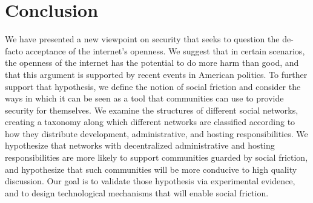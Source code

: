 \documentclass[sigconf,authordraft]{acmart}
\begin{document}
\section{Conclusion}

We have presented a new viewpoint on security that seeks to question the de-facto acceptance of the internet's openness. We suggest that in certain scenarios, the openness of the internet has the potential to do more harm than good, and that this argument is supported by recent events in American politics. To further support that hypothesis, we define the notion of social friction and consider the ways in which it can be seen as a tool that communities can use to provide security for themselves. We examine the structures of different social networks, creating a taxonomy along which different networks are classified according to how they distribute development, administrative, and hosting responsibilities. We hypothesize that networks with decentralized administrative and hosting responsibilities are more likely to support communities guarded by social friction, and hypothesize that such communities will be more conducive to high quality discussion. Our goal is to validate those hypothesis via experimental evidence, and to design technological mechanisms that will enable social friction.




\end{document}
